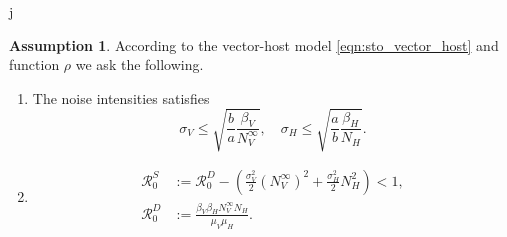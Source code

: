 j\documentclass{amsart}
\theoremstyle{plain}
\theoremstyle{definition}
\newtheorem{assumption}{Assumption}
\begin{document}
        \begin{assumption}\label{ass:extintion}
            According to the vector-host model \eqref{eqn:sto_vector_host} and 
            function
            $\rho$
            we ask the following.
            \begin{enumerate}[(E\textendash1)]
                \item \label{ass:noise_condition}
                    The noise intensities satisfies
                    $$
                        \sigma_V \leq 
                            \sqrt{
                                \frac{b}{a}
                                \frac{\beta_V}{N_V^{\infty}}
                                },
                         \quad
                        \sigma_H \leq
                            \sqrt{
                                \frac{a}{b}
                                \frac{\beta_H }{N_H
                            }}.
                    $$
                \item
                    \begin{equation*}
                        \begin{aligned}
                            \mathcal{R}_0 ^ S &:=
                                \mathcal{R}_0^D - 
                                \left( 
                                    \frac{\sigma_V ^ 2}{2} (N_V ^ {\infty}) ^ 2
                                    +
                                    \frac{\sigma_H ^ 2}{2} N_H ^ 2
                                \right)
                                <1,
                                \\
                            \mathcal{R}_0 ^ D &:=
                                    \frac{\beta_V \beta_H N_V ^ \infty 
                                    N_H}{\mu_V \mu_H} .
                        \end{aligned}
                    \end{equation*}
            \end{enumerate}
        \end{assumption}        
%
%
%
%
\end{document}
